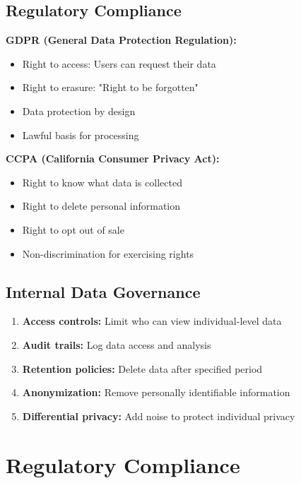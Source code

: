 \subsection{Regulatory Compliance}

\textbf{GDPR (General Data Protection Regulation):}
\begin{itemize}
    \item Right to access: Users can request their data
    \item Right to erasure: "Right to be forgotten"
    \item Data protection by design
    \item Lawful basis for processing
\end{itemize}

\textbf{CCPA (California Consumer Privacy Act):}
\begin{itemize}
    \item Right to know what data is collected
    \item Right to delete personal information
    \item Right to opt out of sale
    \item Non-discrimination for exercising rights
\end{itemize}

\subsection{Internal Data Governance}

\begin{enumerate}
    \item \textbf{Access controls:} Limit who can view individual-level data

    \item \textbf{Audit trails:} Log data access and analysis

    \item \textbf{Retention policies:} Delete data after specified period

    \item \textbf{Anonymization:} Remove personally identifiable information

    \item \textbf{Differential privacy:} Add noise to protect individual privacy
\end{enumerate}

\section{Regulatory Compliance}

